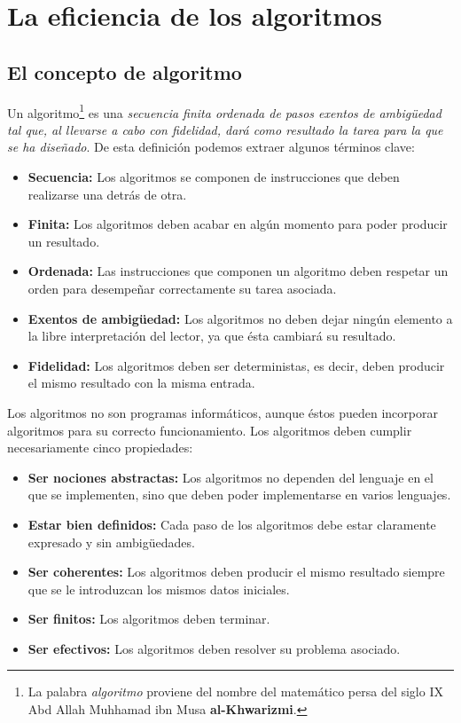 \chapter{La eficiencia de los algoritmos}

\section{El concepto de algoritmo}

Un algoritmo\footnote{La palabra \textit{algoritmo} proviene del nombre del matemático persa del siglo IX Abd Allah Muhhamad ibn Musa \textbf{al-Khwarizmi}.} es una \textit{secuencia finita ordenada de pasos exentos de ambigüedad tal que, al llevarse a cabo con fidelidad, dará como resultado la tarea para la que se ha diseñado}.
De esta definición podemos extraer algunos términos clave:

\begin{itemize}
	\item\textbf{Secuencia:} Los algoritmos se componen de instrucciones que deben realizarse una detrás de otra.
	\item\textbf{Finita:} Los algoritmos deben acabar en algún momento para poder producir un resultado.
	\item\textbf{Ordenada:} Las instrucciones que componen un algoritmo deben respetar un orden para desempeñar correctamente su tarea asociada.
	\item\textbf{Exentos de ambigüedad:} Los algoritmos no deben dejar ningún elemento a la libre interpretación del lector, ya que ésta cambiará su resultado.
	\item\textbf{Fidelidad:} Los algoritmos deben ser deterministas, es decir, deben producir el mismo resultado con la misma entrada.
\end{itemize}

Los algoritmos no son programas informáticos, aunque éstos pueden incorporar algoritmos para su correcto funcionamiento.
Los algoritmos deben cumplir necesariamente cinco propiedades:

\begin{itemize}
	\item\textbf{Ser nociones abstractas:} Los algoritmos no dependen del lenguaje en el que se implementen, sino que deben poder implementarse en varios lenguajes.
	\item\textbf{Estar bien definidos:} Cada paso de los algoritmos debe estar claramente expresado y sin ambigüedades.
	\item\textbf{Ser coherentes:} Los algoritmos deben producir el mismo resultado siempre que se le introduzcan los mismos datos iniciales.
	\item\textbf{Ser finitos:} Los algoritmos deben terminar.
	\item\textbf{Ser efectivos:} Los algoritmos deben resolver su problema asociado.
\end{itemize}

